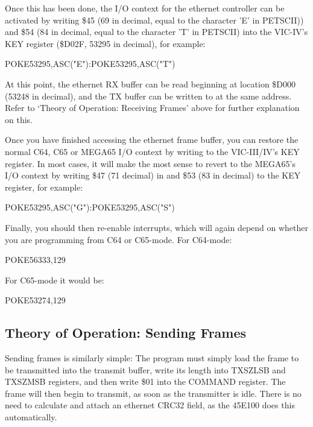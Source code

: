 Once this has been done, the I/O context for the ethernet controller can be activated by writing \$45 (69 in decimal, equal to the character 'E' in PETSCII)) and \$54 (84 in decimal, equal to the character 'T' in PETSCII) into the VIC-IV's KEY register (\$D02F, 53295 in decimal), for example:

\begin{screencode}
POKE53295,ASC("E"):POKE53295,ASC("T")
\end{screencode}

At this point, the ethernet RX buffer can be read beginning at location \$D000 (53248 in decimal), and the TX buffer can be written to at the same address.  Refer to `Theory of Operation: Receiving Frames' above for further explanation on this.

Once you have finished accessing the ethernet frame buffer, you can restore the normal C64, C65 or MEGA65 I/O context by writing to the VIC-III/IV's KEY register.  In most cases, it will make the most sense to revert to the MEGA65's I/O context by writing \$47 (71 decimal) in and \$53 (83 in decimal) to the KEY register, for example:

\begin{screencode}
POKE53295,ASC("G"):POKE53295,ASC("S")
\end{screencode}

Finally, you should then re-enable interrupts, which will again depend on whether you are programming from C64 or C65-mode.  For C64-mode:

\begin{screencode}
POKE56333,129
\end{screencode}

For C65-mode it would be:

\begin{screencode}
POKE53274,129
\end{screencode}



\subsection{Theory of Operation: Sending Frames}

Sending frames is similarly simple: The program must simply load the frame to be transmitted into
the transmit buffer, write its length into TXSZLSB and TXSZMSB registers, and then write \$01 into
the COMMAND register.  The frame will then begin to transmit, as soon as the transmitter is idle.
There is no need to calculate and attach an ethernet CRC32 field, as the 45E100 does this automatically.


